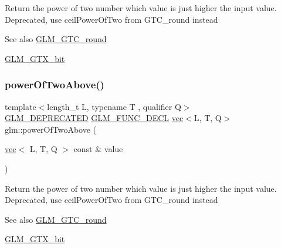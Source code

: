 Return the power of two number which value is just higher the input value. Deprecated, use ceil\+Power\+Of\+Two from G\+T\+C\+\_\+round instead

\begin{DoxySeeAlso}{See also}
\hyperlink{group__gtc__round}{G\+L\+M\+\_\+\+G\+T\+C\+\_\+round} 

\hyperlink{group__gtx__bit}{G\+L\+M\+\_\+\+G\+T\+X\+\_\+bit} 
\end{DoxySeeAlso}
\mbox{\label{group__gtx__bit_ga2bbded187c5febfefc1e524ba31b3fab}} 
\subsubsection{\texorpdfstring{power\+Of\+Two\+Above()}{powerOfTwoAbove()}\hspace{0.1cm}{\footnotesize\ttfamily [2/2]}}
{\footnotesize\ttfamily template$<$length\+\_\+t L, typename T , qualifier Q$>$ \\
\hyperlink{setup_8hpp_a8edfb48cdc249a3ee48406bf179023dc}{G\+L\+M\+\_\+\+D\+E\+P\+R\+E\+C\+A\+T\+ED} \hyperlink{setup_8hpp_ab2d052de21a70539923e9bcbf6e83a51}{G\+L\+M\+\_\+\+F\+U\+N\+C\+\_\+\+D\+E\+CL} \hyperlink{structglm_1_1vec}{vec}$<$L, T, Q$>$ glm\+::power\+Of\+Two\+Above (\begin{DoxyParamCaption}\item[{\hyperlink{structglm_1_1vec}{vec}$<$ L, T, Q $>$ const \&}]{value }\end{DoxyParamCaption})}

Return the power of two number which value is just higher the input value. Deprecated, use ceil\+Power\+Of\+Two from G\+T\+C\+\_\+round instead

\begin{DoxySeeAlso}{See also}
\hyperlink{group__gtc__round}{G\+L\+M\+\_\+\+G\+T\+C\+\_\+round} 

\hyperlink{group__gtx__bit}{G\+L\+M\+\_\+\+G\+T\+X\+\_\+bit} 
\end{DoxySeeAlso}
\mbox{\label{group__gtx__bit_ga3de7df63c589325101a2817a56f8e29d}} 
